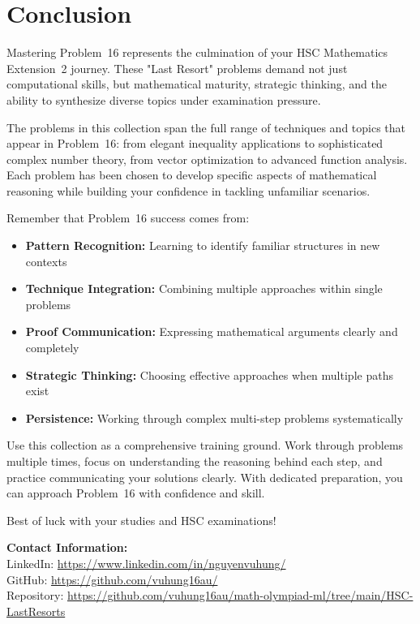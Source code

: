 \documentclass[12pt]{article}
\begin{document}


\newpage
\section{Conclusion}
Mastering Problem~16 represents the culmination of your HSC Mathematics Extension~2 journey. These "Last Resort" problems demand not just computational skills, but mathematical maturity, strategic thinking, and the ability to synthesize diverse topics under examination pressure.

The problems in this collection span the full range of techniques and topics that appear in Problem~16: from elegant inequality applications to sophisticated complex number theory, from vector optimization to advanced function analysis. Each problem has been chosen to develop specific aspects of mathematical reasoning while building your confidence in tackling unfamiliar scenarios.

Remember that Problem~16 success comes from:
\begin{itemize}[leftmargin=*]
  \item \textbf{Pattern Recognition:} Learning to identify familiar structures in new contexts
  \item \textbf{Technique Integration:} Combining multiple approaches within single problems
  \item \textbf{Proof Communication:} Expressing mathematical arguments clearly and completely
  \item \textbf{Strategic Thinking:} Choosing effective approaches when multiple paths exist
  \item \textbf{Persistence:} Working through complex multi-step problems systematically
\end{itemize}

Use this collection as a comprehensive training ground. Work through problems multiple times, focus on understanding the reasoning behind each step, and practice communicating your solutions clearly. With dedicated preparation, you can approach Problem~16 with confidence and skill.

Best of luck with your studies and HSC examinations!

\vspace{2em}
\noindent\textbf{Contact Information:}\\[0.5em]
LinkedIn: \href{https://www.linkedin.com/in/nguyenvuhung/}{https://www.linkedin.com/in/nguyenvuhung/}\\[0.3em]
GitHub: \href{https://github.com/vuhung16au/}{https://github.com/vuhung16au/}\\[0.3em]
Repository: \href{https://github.com/vuhung16au/math-olympiad-ml/tree/main/HSC-LastResorts}{https://github.com/vuhung16au/math-olympiad-ml/tree/main/HSC-LastResorts}
\end{document}
